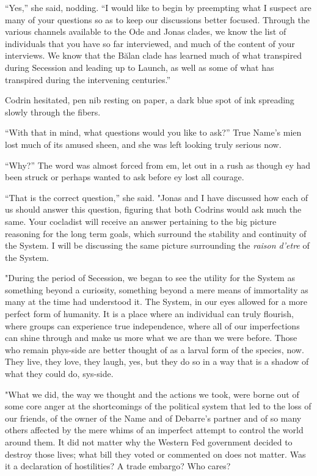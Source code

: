 ``Yes,'' she said, nodding. ``I would like to begin by preempting what I suspect are many of your questions so as to keep our discussions better focused. Through the various channels available to the Ode and Jonas clades, we know the list of individuals that you have so far interviewed, and much of the content of your interviews. We know that the Bălan clade has learned much of what transpired during Secession and leading up to Launch, as well as some of what has transpired during the intervening centuries.''

Codrin hesitated, pen nib resting on paper, a dark blue spot of ink spreading slowly through the fibers.

``With that in mind, what questions would you like to ask?'' True Name's mien lost much of its amused sheen, and she was left looking truly serious now.

``Why?'' The word was almost forced from em, let out in a rush as though ey had been struck or perhaps wanted to ask before ey lost all courage.

``That is the correct question,'' she said. "Jonas and I have discussed how each of us should answer this question, figuring that both Codrins would ask much the same. Your cocladist will receive an answer pertaining to the big picture reasoning for the long term goals, which surround the stability and continuity of the System. I will be discussing the same picture surrounding the \emph{raison d'etre} of the System.

"During the period of Secession, we began to see the utility for the System as something beyond a curiosity, something beyond a mere means of immortality as many at the time had understood it. The System, in our eyes allowed for a more perfect form of humanity. It is a place where an individual can truly flourish, where groups can experience true independence, where all of our imperfections can shine through and make us more what we are than we were before. Those who remain phys-side are better thought of as a larval form of the species, now. They live, they love, they laugh, yes, but they do so in a way that is a shadow of what they could do, sys-side.

"What we did, the way we thought and the actions we took, were borne out of some core anger at the shortcomings of the political system that led to the loss of our friends, of the owner of the Name and of Debarre's partner and of so many others affected by the mere whims of an imperfect attempt to control the world around them. It did not matter why the Western Fed government decided to destroy those lives; what bill they voted or commented on does not matter. Was it a declaration of hostilities? A trade embargo? Who cares?

